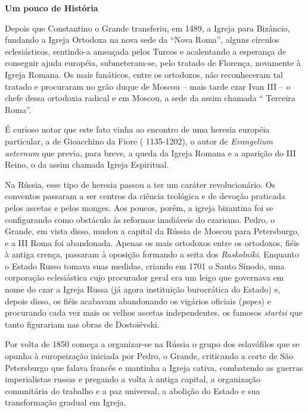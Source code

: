 \textbf{Um pouco de História}

Depois que Constantino o Grande transferiu, em 1489, a Igreja para
Bizâncio, fundando a Igreja Ortodoxa na nova sede da ``Nova Roma'',
alguns círculos eclesiásticos, sentindo-a ameaçada pelos Turcos e
acalentando a esperança de conseguir ajuda européia, submeteram-se, pelo
tratado de Florença, novamente à Igreja Romana. Os mais fanáticos, entre
os ortodoxos, não reconheceram tal tratado e procuraram no grão duque de
Moscou -- mais tarde czar Ivan III -- o chefe dessa ortodoxia radical e
em Moscou, a sede da assim chamada `` Terceira Roma''.

É curioso notar que este fato vinha ao encontro de uma heresia européia
particular, a de Gioacchino da Fiore ( 1135-1202), o autor de
\emph{Evangelium aeternum} que previa, para breve, a queda da Igreja
Romana e a aparição do III Reino, o da assim chamada Igreja Espiritual.

Na Rússia, esse tipo de heresia passou a ter um caráter revolucionário.
Os conventos passaram a ser centros da ciência teológica e de devoção
praticada pelos ascetas e pelos monges. Aos poucos, porém, a igreja
bizantina foi se configurando como obstáculo às reformas inadiáveis do
czarismo. Pedro, o Grande, em vista disso, mudou a capital da Rússia de
Moscou para Petersburgo, e a III Roma foi abandonada. Apenas os mais
ortodoxos entre os ortodoxos, fiéis à antiga crença, passaram à oposição
formando a seita dos \emph{Raskolniki}. Enquanto o Estado Russo tomava
suas medidas, criando em 1701 o Santo Sínodo, uma corporação
eclesiástica cujo procurador geral era um leigo que governava em nome do
czar a Igreja Russa (já agora instituição burocrática do Estado) e,
depois disso, os fiéis acabavam abandonando os vigários oficiais
(\emph{popes}) e procurando cada vez mais os velhos ascetas
independentes, os famosos \emph{startsi} que tanto figurariam nas obras
de Dostoiévski.

Por volta de 1850 começa a organizar-se na Rússia o grupo dos
eslavófilos que se opunha à europeização iniciada por Pedro, o Grande,
criticando a corte de São Petersburgo que falava francês e mantinha a
Igreja cativa, combatendo as guerras imperialistas russas e pregando a
volta à antiga capital, a organização comunitária do trabalho e a paz
universal, a abolição do Estado e sua transformação gradual em Igreja.

